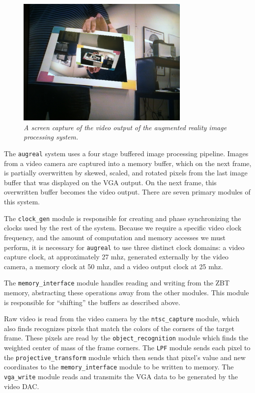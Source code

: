 \documentclass[10pt]{article}
\begin{document}
\begin{figure}[h!]
\centering
\includegraphics[width=0.75\textwidth]{images/IMG_0113.JPG}
\caption{\emph{A screen capture of the video output of the augmented reality image processing system.}}
\end{figure}

The {\tt augreal} system uses a four stage buffered image processing pipeline. Images from a video camera are captured into a memory buffer, which on the next frame, is partially overwritten by skewed, scaled, and rotated pixels from the last image buffer that was displayed on the VGA output. On the next frame, this overwritten buffer becomes the video output. There are seven primary modules of this system.

The {\tt clock\_gen} module is responsible for creating and phase synchronizing the clocks used by the rest of the system. Because we require a specific video clock frequency, and the amount of computation and memory accesses we must perform, it is necessary for {\tt augreal} to use three distinct clock domains: a video capture clock, at approximately 27 mhz, generated externally by the video camera, a memory clock at 50 mhz, and a video output clock at 25 mhz.

The {\tt memory\_interface} module handles reading and writing from the ZBT memory, abstracting these operations away from the other modules. This module is responsible for ``shifting'' the buffers as described above.

Raw video is read from the video camera by the {\tt ntsc\_capture} module, which also finds recognizes pixels that match the colors of the corners of the target frame. These pixels are read by the {\tt object\_recognition} module which finds the weighted center of mass of the frame corners. The {\tt LPF} module sends each pixel to the {\tt projective\_transform} module which then sends that pixel's value and new coordinates to the {\tt memory\_interface} module to be written to memory. The {\tt vga\_write} module reads and transmits the VGA data to be generated by the video DAC.
\end{document}
